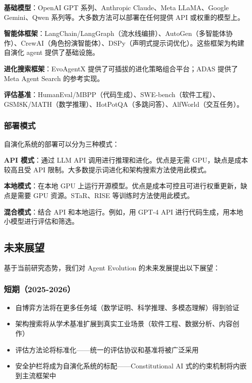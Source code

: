 \textbf{基础模型}：OpenAI GPT 系列、Anthropic Claude、Meta LLaMA、Google Gemini、Qwen 系列等。大多数方法可以部署在任何提供 API 或权重的模型上。

\textbf{智能体框架}：LangChain/LangGraph（流水线编排）、AutoGen（多智能体协作）、CrewAI（角色扮演智能体）、DSPy（声明式提示词优化）。这些框架为构建自演化 agent 提供了基础设施。

\textbf{进化搜索框架}：EvoAgentX 提供了可插拔的进化策略组合平台；ADAS 提供了 Meta Agent Search 的参考实现。

\textbf{评估基准}：HumanEval/MBPP（代码生成）、SWE-bench（软件工程）、GSM8K/MATH（数学推理）、HotPotQA（多跳问答）、AlfWorld（交互任务）。

\subsubsection{部署模式}

自演化系统的部署可以分为三种模式：

\textbf{API 模式}：通过 LLM API 调用进行推理和进化。优点是无需 GPU，缺点是成本较高且受 API 限制。大多数提示词进化和架构搜索方法使用此模式。

\textbf{本地模式}：在本地 GPU 上运行开源模型。优点是成本可控且可进行权重更新，缺点是需要 GPU 资源。STaR、RISE 等训练时方法使用此模式。

\textbf{混合模式}：结合 API 和本地运行。例如，用 GPT-4 API 进行代码生成，用本地小模型进行评估和筛选。

\subsection{未来展望}\label{sec:intro-future}

基于当前研究态势，我们对 Agent Evolution 的未来发展提出以下展望：

\subsubsection{短期（2025-2026）}

\begin{itemize}
\item 自博弈方法将在更多任务域（数学证明、科学推理、多模态理解）得到验证
\item 架构搜索将从学术基准扩展到真实工业场景（软件工程、数据分析、内容创作）
\item 评估方法论将标准化——统一的评估协议和基准将被广泛采用
\item 安全护栏将成为自演化系统的标配——Constitutional AI 式的约束机制将内嵌到主流框架中
\end{itemize}


